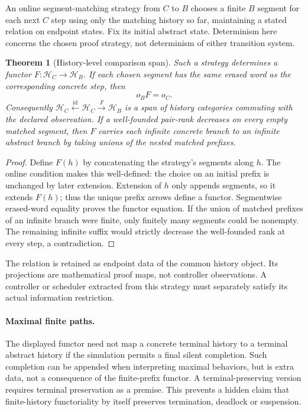 \documentclass[11pt]{article}
\newtheorem{theorem}{Theorem}[section]
\begin{document}
An online segment-matching strategy from $C$ to $B$ chooses a finite $B$ segment for each next $C$ step using only the matching history so far, maintaining a stated relation on endpoint states. Fix its initial abstract state. Determinism here concerns the chosen proof strategy, not determinism of either transition system.
\begin{theorem}[History-level comparison span]\label{carrier:span}
Such a strategy determines a functor $F:\mathcal H_C\to\mathcal H_B$. If each chosen segment has the same erased word as the corresponding concrete step, then
\[
 o_BF=o_C.
\]
Consequently $\mathcal H_C\xleftarrow{\mathrm{id}}\mathcal H_C\xrightarrow{F}\mathcal H_B$ is a span of history categories commuting with the declared observation. If a well-founded pair-rank decreases on every empty matched segment, then $F$ carries each infinite concrete branch to an infinite abstract branch by taking unions of the nested matched prefixes.
\end{theorem}
\begin{proof}
Define $F(h)$ by concatenating the strategy's segments along $h$. The online condition makes this well-defined: the choice on an initial prefix is unchanged by later extension. Extension of $h$ only appends segments, so it extends $F(h)$; thus the unique prefix arrows define a functor. Segmentwise erased-word equality proves the functor equation. If the union of matched prefixes of an infinite branch were finite, only finitely many segments could be nonempty. The remaining infinite suffix would strictly decrease the well-founded rank at every step, a contradiction.
\end{proof}
The relation is retained as endpoint data of the common history object. Its projections are mathematical proof maps, not controller observations. A controller or scheduler extracted from this strategy must separately satisfy its actual information restriction.

\paragraph{Maximal finite paths.} The displayed functor need not map a concrete terminal history to a terminal abstract history if the simulation permits a final silent completion. Such completion can be appended when interpreting maximal behaviors, but is extra data, not a consequence of the finite-prefix functor. A terminal-preserving version requires terminal preservation as a premise. This prevents a hidden claim that finite-history functoriality by itself preserves termination, deadlock or suspension.
\end{document}
